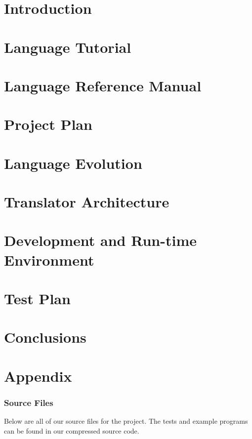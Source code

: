\documentclass[11pt]{article}
\begin{document}


\newpage
\tableofcontents
\newpage
\part{Introduction}


\part{Language Tutorial}


\part{Language Reference Manual}


\part{Project Plan}



\part{Language Evolution}


\part{Translator Architecture}


\part{Development and Run-time Environment}


\part{Test Plan}


\part{Conclusions}


\part{Appendix}
\section{Source Files}
Below are all of our source files for the project. The tests and example programs can be found in our compressed source code.
\end{document}
